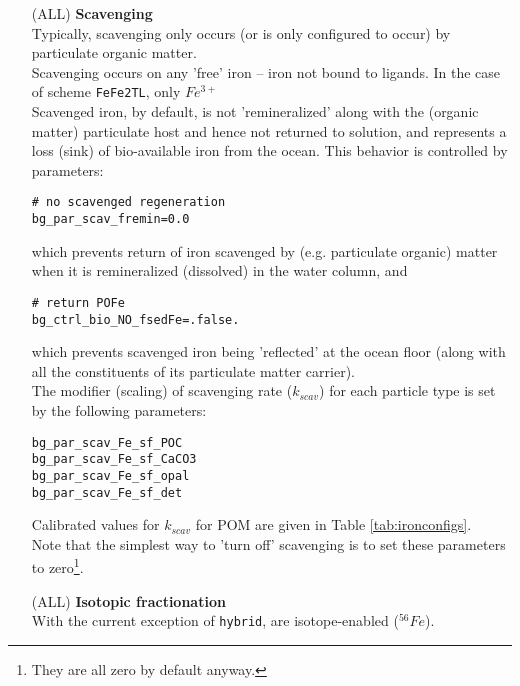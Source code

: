 \begin{itemize}[noitemsep]
\vspace{1mm}
\item [(ALL)] \textbf{Scavenging}
\\Typically, scavenging only occurs (or is only configured to occur) by particulate organic matter.
\\Scavenging occurs on any 'free' iron -- iron not bound to ligands. In the case of scheme \texttt{FeFe2TL}, only \(Fe^{3+}\)
\\Scavenged iron, by default, is not 'remineralized' along with the (organic matter) particulate host and hence not returned to solution, and represents a loss (sink) of bio-available iron from the ocean. This behavior is controlled by parameters:
\small\vspace{-1pt}\begin{verbatim}
# no scavenged regeneration
bg_par_scav_fremin=0.0
\end{verbatim}\vspace{-1pt}\normalsize
which prevents return of iron scavenged by (e.g. particulate organic) matter when it is remineralized (dissolved) in the water column, and
\small\vspace{-1pt}\begin{verbatim}
# return POFe
bg_ctrl_bio_NO_fsedFe=.false.
\end{verbatim}\vspace{-1pt}\normalsize
which prevents scavenged iron being 'reflected' at the ocean floor (along with all the constituents of its particulate matter carrier).
\\The modifier (scaling) of scavenging rate (\(k_{scav}\)) for each particle type is set by the following parameters:
\small\vspace{-1pt}\begin{verbatim}
bg_par_scav_Fe_sf_POC
bg_par_scav_Fe_sf_CaCO3
bg_par_scav_Fe_sf_opal
bg_par_scav_Fe_sf_det
\end{verbatim}\vspace{-1pt}\normalsize
Calibrated values for \(k_{scav}\) for POM are given in Table \ref{tab:ironconfigs}.
\\Note that the simplest way to 'turn off' scavenging is  to set these parameters to zero\footnote{They are all zero by default anyway.}. 

\vspace{1mm}
\item [(ALL)] \textbf{Isotopic fractionation}
\\With the current exception of \texttt{hybrid}, are isotope-enabled (\(^{56}Fe\)).


\end{itemize}
